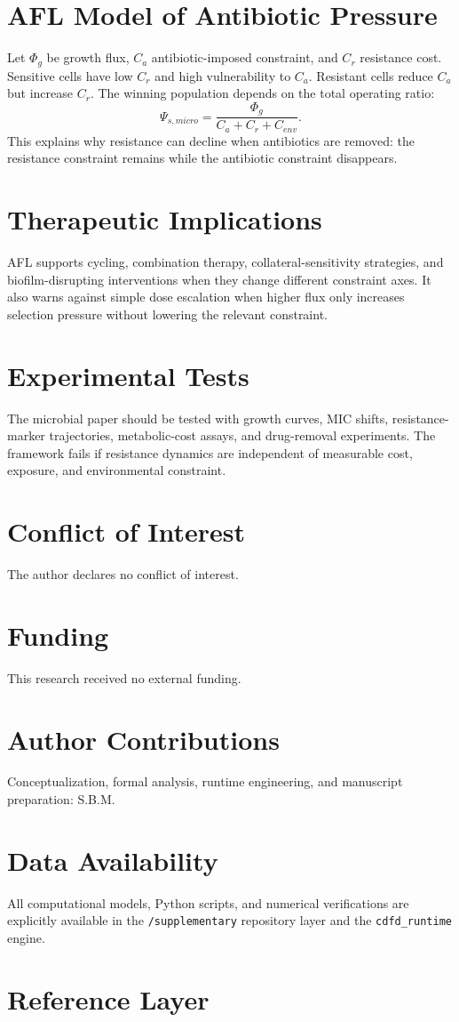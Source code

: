 \documentclass[11pt]{article}
\begin{document}
\section{AFL Model of Antibiotic Pressure}
Let $\Phi_g$ be growth flux, $C_a$ antibiotic-imposed constraint, and $C_r$ resistance cost. Sensitive cells have low $C_r$ and high vulnerability to $C_a$. Resistant cells reduce $C_a$ but increase $C_r$. The winning population depends on the total operating ratio:
\begin{equation}
\Psi_{s,micro} = \frac{\Phi_g}{C_a + C_r + C_{env}}.
\end{equation}
This explains why resistance can decline when antibiotics are removed: the resistance constraint remains while the antibiotic constraint disappears.

\section{Therapeutic Implications}
AFL supports cycling, combination therapy, collateral-sensitivity strategies, and biofilm-disrupting interventions when they change different constraint axes. It also warns against simple dose escalation when higher flux only increases selection pressure without lowering the relevant constraint.

\section{Experimental Tests}
The microbial paper should be tested with growth curves, MIC shifts, resistance-marker trajectories, metabolic-cost assays, and drug-removal experiments. The framework fails if resistance dynamics are independent of measurable cost, exposure, and environmental constraint.



\section*{Conflict of Interest} The author declares no conflict of interest.
\section*{Funding} This research received no external funding.
\section*{Author Contributions} Conceptualization, formal analysis, runtime engineering, and manuscript preparation: S.B.M.
\section*{Data Availability} All computational models, Python scripts, and numerical verifications are explicitly available in the \texttt{/supplementary} repository layer and the \texttt{cdfd\_runtime} engine.

\section{Reference Layer}


\end{document}
